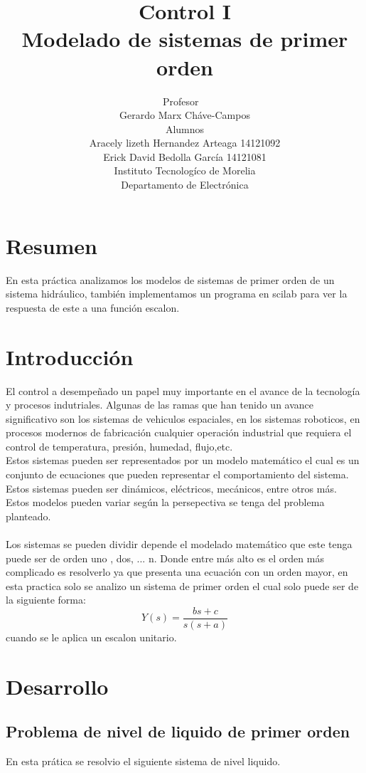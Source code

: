 \documentclass[12pt,a4paper]{IEEEtran}
\title{Control I \\ {\sc Modelado de sistemas de primer orden} }
\author{ Profesor  \\ Gerardo Marx Cháve-Campos\\ Alumnos \\ Aracely lizeth Hernandez Arteaga 14121092 \\ Erick David Bedolla García 14121081\\ Instituto Tecnologíco de Morelia \\ Departamento de Electrónica}
\begin{document}
\maketitle
\tableofcontents
\section{Resumen}
En esta práctica analizamos los modelos de sistemas de primer orden de un sistema hidráulico, también implementamos un programa en scilab para ver la respuesta de este a una función escalon.
\section{Introducción}
El control a desempeñado un papel muy importante en el avance de la tecnología y procesos indutriales. Algunas de las ramas que han tenido un avance significativo son los sistemas de vehiculos espaciales, en los sistemas roboticos, en procesos modernos de fabricación cualquier operación industrial que requiera el control de temperatura, presión, humedad, flujo,etc.\cite{Ogata} \\
Estos sistemas pueden ser representados por un modelo matemático el cual es un conjunto de ecuaciones que pueden representar el comportamiento del sistema. Estos sistemas pueden ser dinámicos, eléctricos, mecánicos, entre otros más. \\
Estos modelos pueden variar según la persepectiva se tenga del problema planteado.\cite{Ogata}
\\ \\
Los sistemas se pueden dividir depende el modelado matemático que este tenga puede ser de orden uno , dos, ... n. Donde entre más alto es el orden más complicado es resolverlo ya que presenta una ecuación con un orden mayor, en esta practica solo se analizo un sistema de primer orden el cual solo puede ser de la siguiente forma:
$$Y(s) = \frac{bs + c}{s(s + a)}$$ cuando se le aplica un escalon unitario.
\section{Desarrollo}
\subsection{Problema de nivel de liquido de primer orden}
En esta prática se resolvio el siguiente sistema de nivel liquido.
\end{document}

